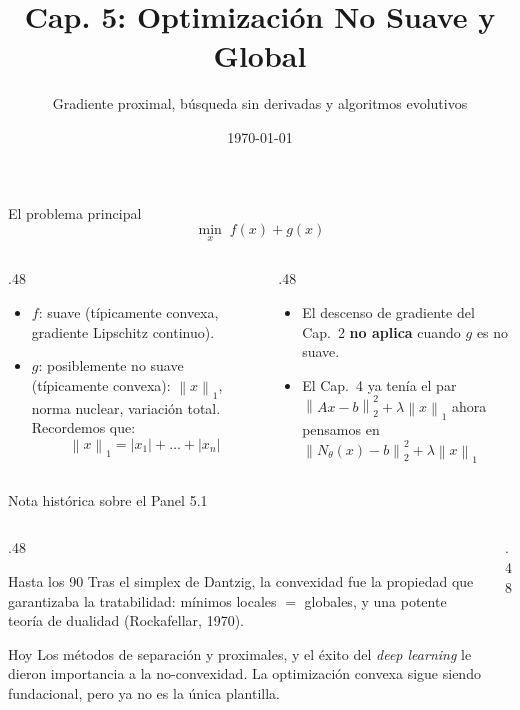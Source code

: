 \documentclass[10pt,aspectratio=169]{beamer}
\title{Cap. 5: Optimización No Suave y Global}
\subtitle{Gradiente proximal, búsqueda sin derivadas y algoritmos evolutivos}
\date{\today}
\newcommand{\norm}[1]{\left\lVert #1 \right\rVert}
\begin{document}

\begin{frame}
  \titlepage
\end{frame}

\begin{frame}{El problema principal}
  \[
    \min_x\; f(x) + g(x) \tag{5.1}
  \]
  \begin{columns}[T,onlytextwidth]
    \begin{column}{.48\textwidth}
      \begin{itemize}
        \item $f$: suave (típicamente convexa, gradiente Lipschitz continuo).
        \item $g$: posiblemente no suave (típicamente convexa): $\norm{x}_1$,
            norma nuclear, variación total. Recordemos que:
            $$\norm{x}_1 = |x_1| + \ldots + |x_n|$$
      \end{itemize}
    \end{column}
    \begin{column}{.48\textwidth}
      \begin{itemize}
        \item El descenso de gradiente del Cap.~2 \textbf{no aplica} cuando $g$
          es no suave.
          \item El Cap.~4 ya tenía el par $\norm{Ax-b}_2^2 + \lambda\norm{x}_1$ ahora pensamos en $\norm{N_\theta(x)-b}_2^2 + \lambda\norm{x}_1$
      \end{itemize}
    \end{column}
  \end{columns}
\end{frame}

\begin{frame}{Nota histórica sobre el Panel 5.1}
  \small
  \begin{columns}[T,onlytextwidth]
    \begin{column}{.48\textwidth}
      \begin{block}{Hasta los 90}
        \small
        Tras el simplex de Dantzig, la convexidad fue la propiedad que
        garantizaba la tratabilidad: mínimos locales $=$ globales, y una
        potente teoría de dualidad (Rockafellar, 1970).
      \end{block}
      \begin{block}{Hoy}
        \small
        Los métodos de separación y proximales, y el éxito del
        \emph{deep learning} le dieron importancia a la no-convexidad. La optimización convexa sigue
        siendo fundacional, pero ya no es la única plantilla.
      \end{block}
    \end{column}
    \begin{column}{.48\textwidth}
    \end{column}
  \end{columns}
\end{frame}
\end{document}
